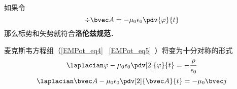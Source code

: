 
\begin{issues}
\issueDraft
\end{issues}


如果令
\begin{equation}
\div \bvec A = -\mu_0 \epsilon_0 \pdv{\varphi}{t}
\end{equation}
那么标势和矢势就符合\textbf{洛伦兹规范}． 

麦克斯韦方程组（\autoref{EMPot_eq4}~ \autoref{EMPot_eq5}~）将变为十分对称的形式
\begin{equation}
\laplacian \varphi - \mu_0\epsilon_0 \pdv[2]{\varphi}{t} = -\frac{\rho}{\epsilon_0}
\end{equation}
\begin{equation}
\laplacian \bvec A - \mu_0\epsilon_0 \pdv[2]{\bvec A}{t} = -\mu_0 \bvec j
\end{equation}
